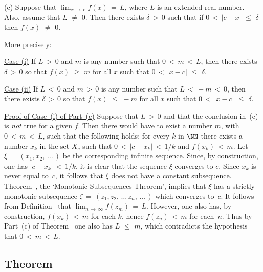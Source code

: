 \V

        (c) Suppose that ${\displaystyle \lim_{x \,{\rightarrow}\, c} f(x) \,=\, L}$,
    where $L$ is an extended real number. Also, assume that $L \,\,{\neq}\,\, 0$.
    Then there exists ${\delta}\,>\,0$ such that if $0\,<\,|c-x|\,\,{\leq}\,\,{\delta}$ then $f(x) \,\,{\neq}\,\, 0$.

        More precisely:

        \underline{Case (i)} If $L\,>\,0$ and $m$ is any number such that $0\,<\,m\,<\,L$, then there exists ${\delta}\,>\,0$ so that $f(x)\,\,{\geq}\,\,m$ for all $x$ such that $0\,<\,|x-c|\,\,{\leq}\,\,{\delta}$.

        \underline{Case (ii)} If $L\,<\,0$ and $m\,>\,0$ is any number such that $L\,<\,-m\,<\,0$, then there exists ${\delta}\,>\,0$ so that $f(x)\,\,{\leq}\,\,-m$ for all $x$ such that $0\,<\,|x-c|\,\,{\leq}\,\,{\delta}$.

\V

        \underline{Proof of Case~(i) of Part~(c)} Suppose that $L\,>\,0$ and that the conclusion in~(c) is {\em not} true for a given $f$.
    Then there would have to exist a number $m$, with $0\,<\,m\,<\,L$, such that the following holds:
    for every $k$ in ${\NN}$ there exists a number $x_{k}$ in the set $X_{c}$ such that $0\,<\,|c-x_{k}|\,<\,1/k$ and $f(x_{k})\,<\,m$.
    Let ${\xi} \,=\, (x_{1},x_{2},\,{\ldots}\,)$ be the corresponding infinite sequence.
    Since, by construction, one has $|c-x_{k}|\,<\,1/k$, it is clear that the sequence ${\xi}$ converges to $c$.
    Since $x_{k}$ is never equal to~$c$, it follows that ${\xi}$ does not have a constant subsequence.
    Theorem~, the `Monotonic-Subsequences Theorem', implies that ${\xi}$ has a strictly monotonic subsequence
    ${\zeta} \,=\, (z_{1},z_{2},\,{\ldots}\,z_{n},\,{\ldots}\,)$ which converges to~$c$.
    It follows from Definition~ that $\lim_{n \,{\rightarrow}\, {\infty}} f(z_{m})\,=\,L$.
    However, one also has, by construction, $f(x_{k})\,<\,m$ for each $k$, hence $f(z_{n})\,<\,m$ for each~$n$.
    Thus by Part~(c) of Theorem~ one also has $L\,\,{\leq}\,\,m$, which contradicts the hypothesis that $0\,<\,m\,<\,L$.

\VV

            \subsection{\small{\bf Theorem}}
            \label{ThmC90.70}

